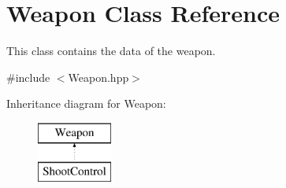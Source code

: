 \hypertarget{class_weapon}{}\section{Weapon Class Reference}
\label{class_weapon}


This class contains the data of the weapon.  




{\ttfamily \#include $<$Weapon.\+hpp$>$}

Inheritance diagram for Weapon\+:\begin{figure}[H]
\begin{center}
\leavevmode
\includegraphics[height=2.000000cm]{class_weapon}
\end{center}
\end{figure}
